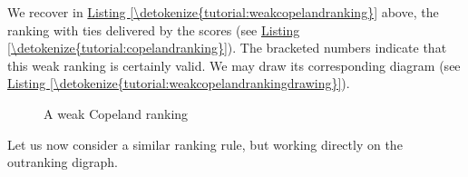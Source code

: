 \documentclass[a4paper,12pt,english]{sphinxhowto}
\let\sphinxpxdimen\pdfpxdimen\else\newdimen\sphinxpxdimen
\begin{document}
We recover in \hyperref[\detokenize{tutorial:weakcopelandranking}]{Listing \ref{\detokenize{tutorial:weakcopelandranking}}} above, the ranking with ties delivered by the  scores (see \hyperref[\detokenize{tutorial:copelandranking}]{Listing \ref{\detokenize{tutorial:copelandranking}}}). The bracketed numbers indicate that this weak ranking is certainly valid. We may draw its corresponding  diagram (see \hyperref[\detokenize{tutorial:weakcopelandrankingdrawing}]{Listing \ref{\detokenize{tutorial:weakcopelandrankingdrawing}}}).
\def\sphinxLiteralBlockLabel{\label{\detokenize{tutorial:weakcopelandrankingdrawing}}}
\begin{sphinxVerbatim}[commandchars=\\\{\},numbers=left,firstnumber=1,stepnumber=1]
\end{sphinxVerbatim}

\begin{figure}[H]
\centering
\capstart

\noindent\sphinxincludegraphics[width=200\sphinxpxdimen]{{weakCopelandRanking}.png}
\caption{A weak Copeland ranking}\label{\detokenize{tutorial:weakrankingdrawing}}\end{figure}

Let us now consider a similar ranking rule, but working directly on the  outranking digraph.
\end{document}
